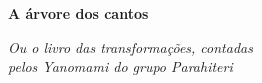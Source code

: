 

\thispagestyle{empty}






\begingroup\thispagestyle{empty}\vspace*{.05\textheight} 

              {\formular
              \huge
              \noindent
              \textbf{A árvore dos cantos}\\
              
              \vspace{-0.5cm}
              
              }

              \vspace{0.5cm}

              \noindent{}\textit{Ou o livro das transformações, contadas\\pelos Yanomami do  grupo Parahiteri}
                    
\endgroup
\vfill
\pagebreak